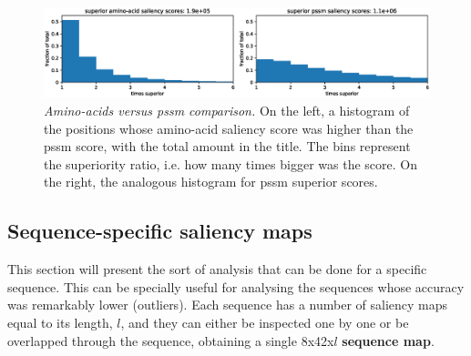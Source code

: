 \begin{figure}
\centering
\includegraphics[width=1\linewidth]{Figures/aa_pssm}
\caption{\textit{Amino-acids versus pssm comparison.} On the left, a histogram of the positions whose amino-acid saliency score was higher than the pssm score, with the total amount in the title. The bins represent the superiority ratio, i.e. how many times bigger was the score. On the right, the analogous histogram for pssm superior scores.}
\label{fig:aa_pssm}
\end{figure}


	
	\subsection{Sequence-specific saliency maps}
	This section will present the sort of analysis that can be done for a specific sequence. This can be specially useful for analysing the sequences whose accuracy was remarkably lower (outliers). Each sequence has a number of saliency maps equal to its length, $l$, and they can either be inspected one by one or be overlapped through the sequence, obtaining a single 8x42x$l$ \textbf{sequence map}.
	
		
	

